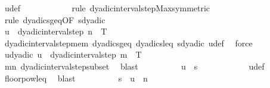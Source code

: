 \begin{isabellebody}
\ u{\isacharunderscore}{\kern0pt}def\isanewline
\ \ \ \ \ \ \ \ \ \ \isamarkupfalse%
\ {\isacharparenleft}{\kern0pt}rule\ dyadic{\isacharunderscore}{\kern0pt}interval{\isacharunderscore}{\kern0pt}step{\isacharunderscore}{\kern0pt}Max{\isacharbrackleft}{\kern0pt}symmetric{\isacharbrackright}{\kern0pt}{\isacharparenright}{\kern0pt}\isanewline
\ \ \ \ \ \ \ \ \ \ \isamarkupfalse%
\ {\isacharparenleft}{\kern0pt}rule\ dyadics{\isacharunderscore}{\kern0pt}geq{\isacharbrackleft}{\kern0pt}OF\ s{\isacharunderscore}{\kern0pt}dyadic{\isacharbrackright}{\kern0pt}{\isacharparenright}{\kern0pt}\isanewline
\ \ \ \ \ \ \ \ \ \ \isamarkupfalse%
\isanewline
\ \ \ \ \ \ \ \ \isamarkupfalse%
\ \isamarkupfalse%
\ {\isachardoublequoteopen}u\ {\isasymin}\ dyadic{\isacharunderscore}{\kern0pt}interval{\isacharunderscore}{\kern0pt}step\ n\ {}\ T{\isachardoublequoteclose}\isanewline
\ \ \ \ \ \ \ \ \ \ \isamarkupfalse%
\ dyadic{\isacharunderscore}{\kern0pt}interval{\isacharunderscore}{\kern0pt}step{\isacharunderscore}{\kern0pt}mem\ dyadics{\isacharunderscore}{\kern0pt}geq\ dyadics{\isacharunderscore}{\kern0pt}leq\ s{\isacharunderscore}{\kern0pt}dyadic\ u{\isacharunderscore}{\kern0pt}def\ \isamarkupfalse%
\ force\isanewline
\ \ \ \ \ \ \ \ \isamarkupfalse%
\ \isamarkupfalse%
\ u{\isacharunderscore}{\kern0pt}dyadic{\isacharcolon}{\kern0pt}\ {\isachardoublequoteopen}u\ {\isasymin}\ dyadic{\isacharunderscore}{\kern0pt}interval{\isacharunderscore}{\kern0pt}step\ m\ {}\ T{\isachardoublequoteclose}\isanewline
\ \ \ \ \ \ \ \ \ \ \isamarkupfalse%
\ mn{\isacharparenleft}{\kern0pt}{}{\isacharparenright}{\kern0pt}\ dyadic{\isacharunderscore}{\kern0pt}interval{\isacharunderscore}{\kern0pt}step{\isacharunderscore}{\kern0pt}subset\ \isamarkupfalse%
\ blast\isanewline
\ \ \ \ \ \ \ \ \isamarkupfalse%
\ {\isachardoublequoteopen}u\ {\isasymle}\ s{\isachardoublequoteclose}\isanewline
\ \ \ \ \ \ \ \ \ \ \isamarkupfalse%
\ u{\isacharunderscore}{\kern0pt}def\ \isamarkupfalse%
\ floor{\isacharunderscore}{\kern0pt}pow{}{\isacharunderscore}{\kern0pt}leq\ \isamarkupfalse%
\ blast\isanewline
\ \ \ \ \ \ \ \ \isamarkupfalse%
\ {\isachardoublequoteopen}s\ {\isacharless}{\kern0pt}\ u\ {\isacharplus}{\kern0pt}\ {}{\isacharslash}{\kern0pt}{}{\isacharcircum}{\kern0pt}n{\isachardoublequoteclose}\isanewline

\end{isabellebody}
